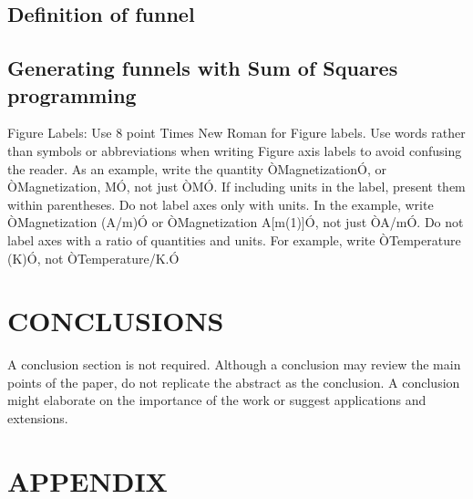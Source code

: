 \documentclass[letterpaper, 10 pt, conference]{ieeeconf}  %
\begin{document}
\subsection{Definition of funnel}
\subsection{Generating funnels with Sum of Squares programming}


Figure Labels: Use 8 point Times New Roman for Figure labels. Use words rather than symbols or abbreviations when writing Figure axis labels to avoid confusing the reader. As an example, write the quantity ÒMagnetizationÓ, or ÒMagnetization, MÓ, not just ÒMÓ. If including units in the label, present them within parentheses. Do not label axes only with units. In the example, write ÒMagnetization (A/m)Ó or ÒMagnetization {A[m(1)]}Ó, not just ÒA/mÓ. Do not label axes with a ratio of quantities and units. For example, write ÒTemperature (K)Ó, not ÒTemperature/K.Ó

\section{CONCLUSIONS}

A conclusion section is not required. Although a conclusion may review the main points of the paper, do not replicate the abstract as the conclusion. A conclusion might elaborate on the importance of the work or suggest applications and extensions. 

\addtolength{\textheight}{-12cm}   %







\section*{APPENDIX}
\end{document}
